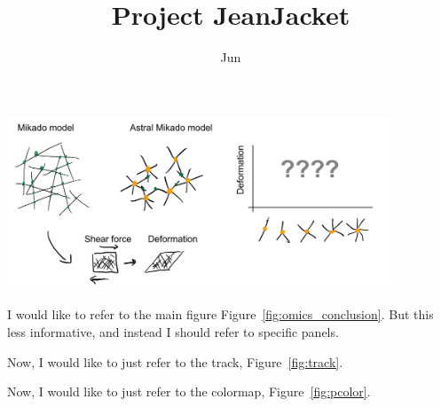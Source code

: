 \documentclass[onecolumn,11pt]{article}
\title{Project JeanJacket}
\author[a]{Jun}
\affil[a]{University of California Irvine}
\date{} %
\begin{document}
\maketitle









\begin{myfigure}[ht]
        \centering
        \includegraphics[width=4.5in]{figures/figJeanJacket.pdf}
\end{myfigure}

I would like to refer to the main figure Figure~\ref{fig:omics_conclusion}. But this less informative, and instead I should refer to specific panels.

Now, I would like to just refer to the track, Figure~\ref{fig:track}.

Now, I would like to just refer to the colormap, Figure~\ref{fig:pcolor}.


\clearpage
\end{document}
